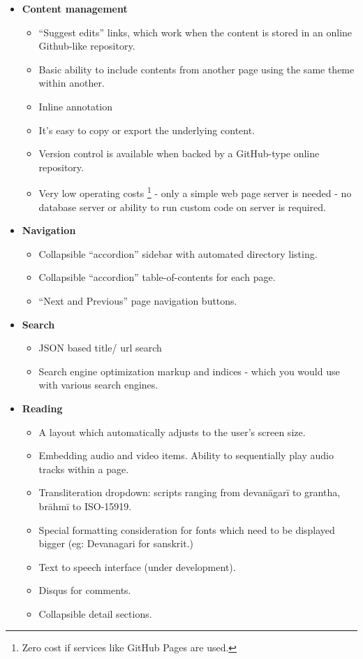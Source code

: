 \documentclass[11pt]{article}
\begin{document}
\begin{itemize}
\tightlist
\item
  \textbf{Content management}

  \begin{itemize}
  \tightlist
  \item
    ``Suggest edits'' links, which work when the content is stored in an online Github-like repository.
  \item
    Basic ability to include contents from another page using the same
    theme within another.
  \item
    Inline annotation
  \item
    It's easy to copy or export the underlying content.
  \item
    Version control is available when backed by a GitHub-type online repository.
  \item
    Very low operating costs \footnote{Zero cost if services like GitHub Pages are used.} - only a simple web page server is needed - no database server or ability to run custom code on server is required.
  \end{itemize}
\item
  \textbf{Navigation}

  \begin{itemize}
  \tightlist
  \item
    Collapsible ``accordion'' sidebar with automated directory listing.
  \item
    Collapsible ``accordion'' table-of-contents for each page.
  \item
    ``Next and Previous'' page navigation buttons.
  \end{itemize}
\item
  \textbf{Search}

  \begin{itemize}
  \tightlist
  \item
    JSON based title/ url search
  \item
    Search engine optimization markup and indices - which you would use
    with various search engines.
  \end{itemize}
\item
  \textbf{Reading}

  \begin{itemize}
  \tightlist
  \item
    A layout which automatically adjusts to the user's screen size.
  \item
    Embedding audio and video items. Ability to sequentially play audio
    tracks within a page.
  \item
    Transliteration dropdown: scripts ranging from devanāgarī to
    grantha, brāhmī to ISO-15919.
  \item
    Special formatting consideration for fonts which need to be
    displayed bigger (eg: Devanagari for sanskrit.)
  \item
    Text to speech interface (under development).
  \item
    Disqus for comments.
  \item
    Collapsible detail sections.
  \end{itemize}
\end{itemize}
\end{document}
